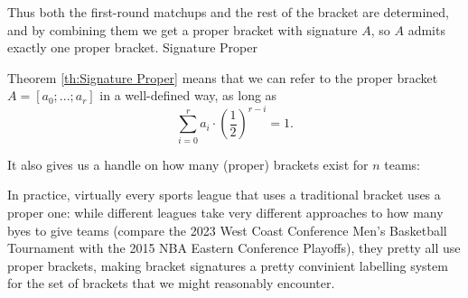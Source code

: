{{    Thus both the first-round matchups and the rest of the bracket are determined, and by combining them we get a proper bracket with signature $A$, so $A$ admits exactly one proper bracket.
}{Signature Proper}

Theorem \ref{th:Signature Proper} means that we can refer to the proper bracket $A = [a_0; ...; a_r]$ in a well-defined way, as long as $$\sum_{i=0}^r a_i \cdot \left(\frac{1}{2}\right)^{r - i} = 1.$$

It also gives us a handle on how many (proper) brackets exist for $n$ teams:


In practice, virtually every sports league that uses a traditional bracket uses a proper one: while different leagues take very different approaches to how many byes to give teams (compare the 2023 West Coast Conference Men's Basketball Tournament with the 2015 NBA Eastern Conference
Playoffs), they pretty all use proper brackets, making bracket signatures a pretty convinient labelling system for the set of brackets that we might reasonably encounter.
}